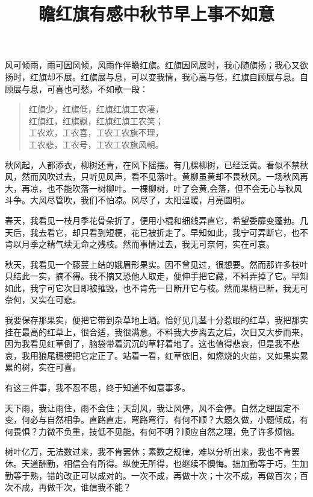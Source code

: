 \documentclass{article}
\begin{document}
\title{瞻红旗有感}
风可倾雨，雨可因风倾，风雨作伴瞻红旗。红旗因风展时，我心随旗扬；我心又欲扬时，红旗却不展。红旗展与息，可以变我情，我心高与低，红旗自顾展与息。自顾展与息，可喜也可愁，不如歌一段：
\begin{verse}
红旗少，红旗低，红旗红旗工农凄，\\
红旗红，红旗飘，红旗红旗工农笑；\\
工农欢，工农喜，工农工农旗不理，\\
工农悲，工农号，工农工农旗风朝。\\
\end{verse}
\title{中秋节早上}
秋风起，人都添衣，柳树还青，在风下摇摆。有几棵柳树，已经泛黄。看似不禁秋风，然而风吹过去，只听见风声，看不见落叶。黄柳虽黄却不畏秋风。一场秋风再大，再凉，也不能吹落一树柳叶。一棵柳树，叶了会黄,会落，但不会无心与秋风斗争。大风尽管吹，我们不怕凉。风尽了，太阳温暖，月亮圆明。
\title{事不如意}
春天，我看见一枝月季花骨朵折了，便用小棍和细线弄直它，希望委靡变蓬勃。几天后，我去看它，却只看到短梗，花已被折走了。早知如此，我宁可弄断它，也不肯以月季之精气续无命之残枝。然而事情过去，我无可奈何，实在可哀。

秋天，我看见一个藤蔓上结的娥眉形果实。因不曾见过，很想要。然而那许多枝叶只结此一实，摘不得。我不摘又恐他人取走，便伸手把它藏，不料弄掉了它。早知如此，我宁可它次日即被摧毁，也不肯先一日断开它与枝。然而果柄已断，我无可奈何，又实在可悲。

我要保存那果实，便把它带到杂草地上晒。恰好见几茎十分惹眼的红草，我把那实挂在最高的红草上，很合适，我很满意。不料我大步离去之后，次日又大步而来，因为我看见红草倒了，脑袋带着沉沉的草籽着地了。这也值得悲哀，但是我不悲哀，我用狼尾穗梗把它定正了。站着一看，红草依旧，如燃烧的火苗，又如果实累累的树，实在可喜。

有这三件事，我不忍不思，终于知道不如意事多。

天下雨，我让雨住，雨不会住；天刮风，我让风停，风不会停。自然之理固定不变，何必与自然相争。直路直走，弯路弯行，有何不顺？大题久做，小题倾成，有何畏惧？力微不负重，技低不见能，有何不明？顺应自然之理，免了许多烦恼。

树叶亿万，无法数过来，我不肯罢休；素数之规律，难以分析出来，我也不肯罢休。天道酬勤，相信会有所得。纵使无所得，也继续不懊悔。拙加勤等于巧，生加勤等于熟，错的改正可以成对的。一次不成，再做十次；十次不成，再做百次；百次不成，再做千次，谁信我不能？
\end{document}

